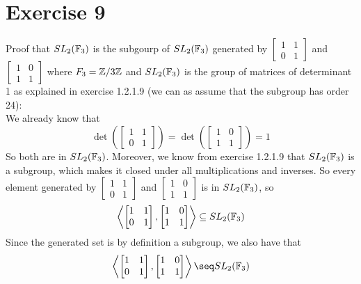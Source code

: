 \documentclass[12pt]{article}
\begin{document}
    \section*{Exercise 9}
    Proof that $SL_2(\mathbb{F}_3)$ is the subgourp of $SL_2(\mathbb{F}_3)$
    generated by $\begin{bmatrix} 1 & 1 \\ 0 & 1 \end{bmatrix}$
    and $\begin{bmatrix} 1 & 0 \\ 1 & 1 \end{bmatrix}$
    where $F_3 = \mathbb{Z}/3\mathbb{Z}$
    and $SL_2(\mathbb{F}_3)$ is the group of matrices of determinant 1
    as explained in exercise 1.2.1.9
    (we can as assume that the subgroup has order 24): \\
    We already know that
    \[\det\left(\begin{bmatrix} 1 & 1 \\ 0 & 1 \end{bmatrix}\right)
    = \det\left(\begin{bmatrix} 1 & 0 \\ 1 & 1 \end{bmatrix}\right)
    = 1\]
    So both are in $SL_2(\mathbb{F}_3)$.
    Moreover, we know from exercise 1.2.1.9 that 
    $SL_2(\mathbb{F}_3)$ is a subgroup,
    which makes it closed under all multiplications and inverses.
    So every element generated
    by $\begin{bmatrix} 1 & 1 \\ 0 & 1 \end{bmatrix}$
    and $\begin{bmatrix} 1 & 0 \\ 1 & 1 \end{bmatrix}$
    is in $SL_2(\mathbb{F}_3)$,
    so
    \[ \left\langle \begin{bmatrix} 1 & 1 \\ 0 & 1 \end{bmatrix},
    \begin{bmatrix} 1 & 0 \\ 1 & 1 \end{bmatrix} \right\rangle
    \subseteq SL_2(\mathbb{F}_3) \]
    Since the generated set is by definition a subgroup,
    we also have that 
    \[ \left\langle \begin{bmatrix} 1 & 1 \\ 0 & 1 \end{bmatrix},
    \begin{bmatrix} 1 & 0 \\ 1 & 1 \end{bmatrix} \right\rangle
    \seq SL_2(\fbb_3) \]
\end{document}
